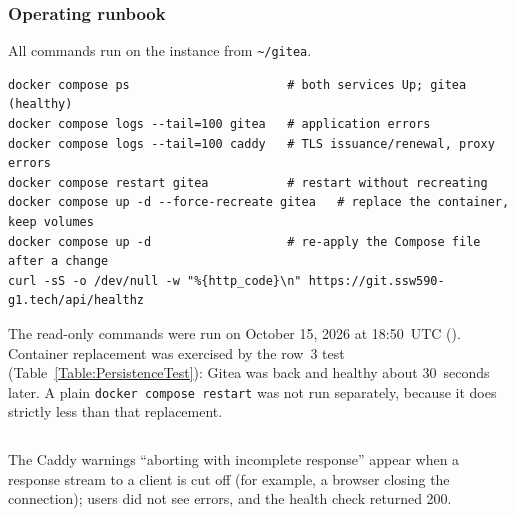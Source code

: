 \subsubsection{Operating runbook}
All commands run on the instance from \texttt{\textasciitilde/gitea}.
\begin{verbatim}
docker compose ps                      # both services Up; gitea (healthy)
docker compose logs --tail=100 gitea   # application errors
docker compose logs --tail=100 caddy   # TLS issuance/renewal, proxy errors
docker compose restart gitea           # restart without recreating
docker compose up -d --force-recreate gitea   # replace the container, keep volumes
docker compose up -d                   # re-apply the Compose file after a change
curl -sS -o /dev/null -w "%{http_code}\n" https://git.ssw590-g1.tech/api/healthz
\end{verbatim}
The read-only commands were run on October 15, 2026 at 18:50~UTC
(). Container replacement was exercised by the row~3 test
(Table~\ref{Table:PersistenceTest}): Gitea was back and healthy about
30~seconds later. A plain \texttt{docker compose restart} was not run
separately, because it does strictly less than that replacement.
\begin{longlisting}
\inputminted[fontsize=\scriptsize]{text}{../evidence/24-runbook-readonly-checks-on-server-sakshi-2026-10-15.txt}
\caption{Read-only runbook commands on the EC2 instance, October 15, 2026, 18:50~UTC (real output; client addresses removed from the Caddy lines).}
\label{Listing:E24}
\end{longlisting}
The Caddy warnings ``aborting with incomplete response'' appear when a
response stream to a client is cut off (for example, a browser closing the
connection); users did not see errors, and the health check returned 200.

